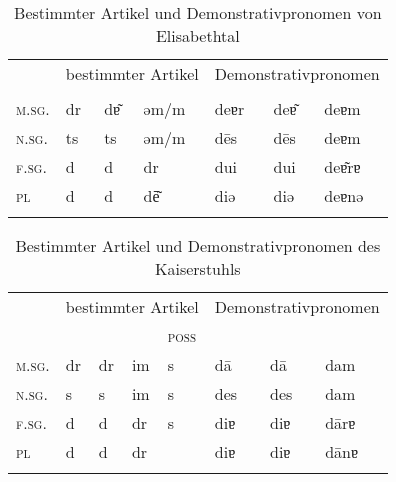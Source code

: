 \begin{table}[H]
	\caption{Bestimmter Artikel und Demonstrativpronomen von Elisabethtal \citep[52]{Žirmunskij1928/29}}\label{table96}
	\begin{tabular}{lllllll}
		\lsptoprule
		& \multicolumn{3}{c}{bestimmter Artikel} & \multicolumn{3}{c}{Demonstrativpronomen} \\\cmidrule(lr){2-4}\cmidrule(lr){5-7}
		& \NOM & \AKK & \DAT & \NOM & \AKK & \DAT\\\midrule
		\textsc{m.sg.} & dr & dɐ͂ & ǝm/m & deɐr & deɐ͂ & deɐm\\
		\textsc{n.sg.} & ts & ts & ǝm/m & d\=es & d\=es & deɐm\\
		\textsc{f.sg.} & d & d & dr & dui & dui & deɐ͂rɐ\\
		\textsc{pl} & d & d & d\=e͂ & diǝ & diǝ & deɐnǝ\\
		\lspbottomrule
	\end{tabular}
\end{table}


\begin{table}[H]
	\caption{Bestimmter Artikel und Demonstrativpronomen des Kaiserstuhls \citep[359-378]{Noth1993}}\label{table97}
	\begin{tabular}{llllllll}
		\lsptoprule
		& \multicolumn{4}{c}{bestimmter Artikel}  & \multicolumn{3}{c}{Demonstrativpronomen} \\\cmidrule(lr){2-5}\cmidrule(lr){6-8}
		& \NOM & \AKK & \DAT & \textsc{poss} & \NOM & \AKK & \DAT\\\midrule
		\textsc{m.sg.} & dr & dr & im & s & d\=a & d\=a & dam\\
		\textsc{n.sg.} & s & s & im & s & des & des & dam\\
		\textsc{f.sg.} & d & d & dr & s & diɐ & diɐ & d\=arɐ\\
		\textsc{pl} & d & d & dr &  & diɐ & diɐ & d\=anɐ\\
		\lspbottomrule
	\end{tabular}
\end{table}


